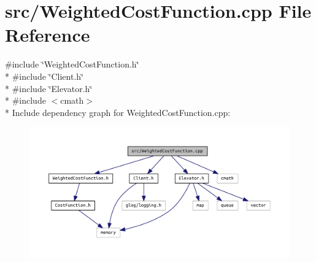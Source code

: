\section{src/\+Weighted\+Cost\+Function.cpp File Reference}
\label{_weighted_cost_function_8cpp}
{\ttfamily \#include \char`\"{}Weighted\+Cost\+Function.\+h\char`\"{}}\\*
{\ttfamily \#include \char`\"{}Client.\+h\char`\"{}}\\*
{\ttfamily \#include \char`\"{}Elevator.\+h\char`\"{}}\\*
{\ttfamily \#include $<$cmath$>$}\\*
Include dependency graph for Weighted\+Cost\+Function.\+cpp\+:\nopagebreak
\begin{figure}[H]
\begin{center}
\leavevmode
\includegraphics[width=350pt]{_weighted_cost_function_8cpp__incl}
\end{center}
\end{figure}
